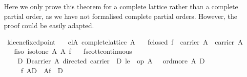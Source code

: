 \begin{isabellebody}
\begin{isamarkuptext}
  Here we only prove this theorem for a complete lattice rather than a
  complete partial order, as we have not formalised complete partial
  orders. However, the proof could be easily adapted.%
\end{isamarkuptext}%
\isamarkuptrue%
\isamarkupfalse%
\ kleene{}fixed{}point{}\isanewline
\ \ \ cl{}A{}\ {}complete{}lattice\ A{}\isanewline
\ \ \ f{}closed{}\ {}f\ {}\ carrier\ A\ {}\ carrier\ A{}\isanewline
\ \ \ f{}iso{}\ {}isotone\ A\ A\ f{}\isanewline
\ \ \ f{}scott{}continuous{}\isanewline
\ \ \ \ {}{}D{}\ {}D{}carrier\ A{}\ directed\ {}carrier\ {}\ D{}\ le\ {}\ op\ {}\isactrlbsub A\ {}\ {}\ ord{}more\ A{}{}\ D\ {}\ {}{}{}\isanewline
\ \ \ \ {}\ f\ {}{}\isactrlbsub A\isactrlesub D{}\ {}\ {}\isactrlbsub Af\ {}\ D{}{}\isanewline

\end{isabellebody}
